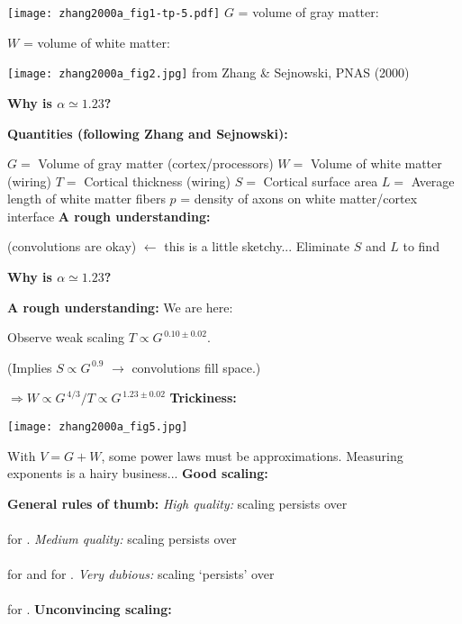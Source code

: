       \texttt{[image: zhang2000a\_fig1-tp-5.pdf]} 
        $G$ = volume of gray matter:\\ 
       
        $W$ = volume of white matter:\\ 
       
      \texttt{[image: zhang2000a\_fig2.jpg]}  
        \small from Zhang \& Sejnowski, PNAS (2000)\cite{zhang2000a}
    
  \textbf{Why is $\alpha \simeq 1.23$?}

  \textbf{Quantities (following Zhang and Sejnowski):}
    
     $G = $ Volume of gray matter (cortex/processors)
     $W = $ Volume of white matter (wiring)
     $T = $ Cortical thickness (wiring)
     $S = $ Cortical surface area
     $L = $ Average length of white matter fibers
     $p$ = density of axons on white matter/cortex interface
  \textbf{A rough understanding:}
    
      (convolutions are okay)
      {$\leftarrow$ this is a little sketchy...}
     Eliminate $S$ and $L$ to find 
  
  \textbf{Why is $\alpha \simeq 1.23$?}

  \textbf{A rough understanding:}
      We are here: 
    
      Observe weak scaling $T \propto G^{\, 0.10 \pm 0.02}$.
    
      (Implies $S \propto G^{\, 0.9}$ $\rightarrow$ convolutions fill space.)
    
      $\Rightarrow W \propto G^{\, 4/3}/T \propto G^{\, 1.23 \pm 0.02}$
  \textbf{Trickiness:}
    \begin{center}
      \texttt{[image: zhang2000a\_fig5.jpg]}
    \end{center}
  
    
     With $V = G + W$, some power laws must be approximations.
     Measuring exponents is a hairy business...
  \textbf{Good scaling:}

  \textbf{General rules of thumb:}
      \textit{High quality:} scaling persists over\\
      \\
      for .
      \textit{Medium quality:} scaling persists over \\
      \\
      for  and 
       for .
      \textit{Very dubious:} scaling `persists' over\\
      \\
      for .
  \textbf{Unconvincing scaling:}

